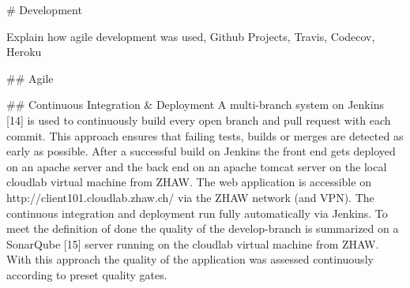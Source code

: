 \begin{markdown}

# Development

Explain how agile development was used, Github Projects, Travis, Codecov, Heroku

## Agile

## Continuous Integration \& Deployment
A multi-branch system on Jenkins [14] is used to continuously build every open branch and pull request with each commit. This approach ensures that failing tests, builds or merges are detected as early as possible. After a successful build on Jenkins the front end gets deployed on an apache server and the back end on an apache tomcat server on the local cloudlab virtual machine from ZHAW. The web application is accessible on http://client101.cloudlab.zhaw.ch/ via the ZHAW network (and VPN). The continuous integration and deployment run fully automatically via Jenkins.
To meet the definition of done the quality of the develop-branch is summarized on a SonarQube [15] server running on the cloudlab virtual machine from ZHAW. With this approach the quality of the application was assessed continuously according to preset quality gates.

\end{markdown}
